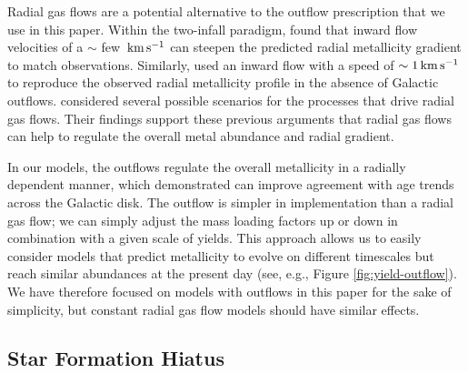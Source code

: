 \documentclass[twocolumn,twocolappendix,linenumbers]{aastex631}
\newcommand{\kms}{\,{\rm km}\,{\rm s}^{-1}}
\begin{document}
Radial gas flows are a potential alternative to the outflow prescription that we use in this paper. Within the two-infall paradigm, \citet{spitoni_effects_2011} found that inward flow velocities of a $\sim$ few $\kms$ can steepen the predicted radial metallicity gradient to match observations. Similarly, \citet{palla_chemical_2020,palla_mapping_2024} used an inward flow with a speed of $\sim1\kms$ to reproduce the observed radial metallicity profile in the absence of Galactic outflows. \citet{johnson_constraints_2025} considered several possible scenarios for the processes that drive radial gas flows. Their findings support these previous arguments that radial gas flows can help to regulate the overall metal abundance and radial gradient.

In our models, the outflows regulate the overall metallicity in a radially dependent manner, which \citet{johnson_milky_2024} demonstrated can improve agreement with age trends across the Galactic disk. 
The outflow is simpler in implementation than a radial gas flow; we can simply adjust the mass loading factors up or down in combination with a given scale of yields. This approach allows us to easily consider models that predict metallicity to evolve on different timescales but reach similar abundances at the present day (see, e.g., Figure \ref{fig:yield-outflow}). 
We have therefore focused on models with outflows in this paper for the sake of simplicity, but constant radial gas flow models should have similar effects.

\subsection{Star Formation Hiatus}
\label{sec:sfe-hiatus}
\end{document}
